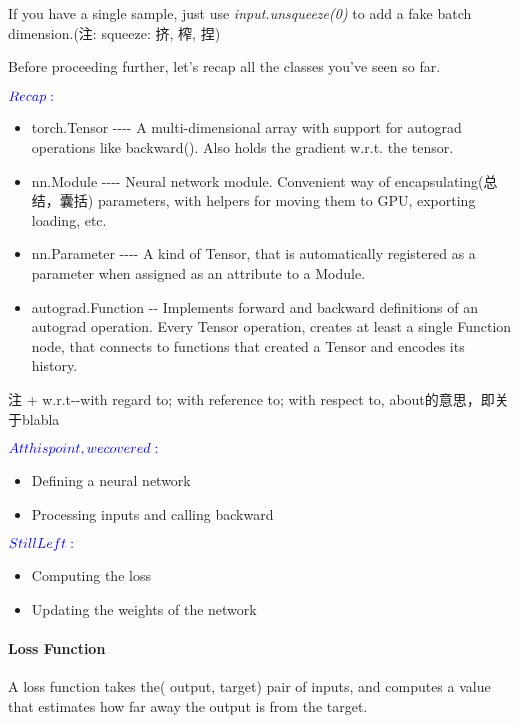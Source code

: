 \documentclass{ctexart}
\providecommand{\tightlist}{%
      \setlength{\itemsep}{0pt}\setlength{\parskip}{0pt}}
\begin{document}
If you have a single sample, just use \emph{input.unsqueeze(0)} to add a
fake batch dimension.(注: squeeze: 挤, 榨, 捏)

Before proceeding further, let's recap all the classes you've seen so
far.

\({\color{blue}{Recap:}}\)

\begin{itemize}
\tightlist
\item
  torch.Tensor -\/-\/-\/- A multi-dimensional array with support for
  autograd operations like backward(). Also holds the gradient w.r.t.
  the tensor.
\item
  nn.Module -\/-\/-\/- Neural network module. Convenient way of
  encapsulating(总结，囊括) parameters, with helpers for moving them to
  GPU, exporting loading, etc.
\item
  nn.Parameter -\/-\/-\/- A kind of Tensor, that is automatically
  registered as a parameter when assigned as an attribute to a Module.
\item
  autograd.Function -\/- Implements forward and backward definitions of
  an autograd operation. Every Tensor operation, creates at least a
  single Function node, that connects to functions that created a Tensor
  and encodes its history.
\end{itemize}

注 + w.r.t-\/-with regard to; with reference to; with respect to,
about的意思，即关于blabla

\({\color{blue}{At this point, we covered:}}\)

\begin{itemize}
\tightlist
\item
  Defining a neural network
\item
  Processing inputs and calling backward
\end{itemize}

\({\color{blue}{Still Left:}}\)

\begin{itemize}
\tightlist
\item
  Computing the loss
\item
  Updating the weights of the network
\end{itemize}

    \paragraph{Loss Function}\label{loss-function}

A loss function takes the( output, target) pair of inputs, and computes
a value that estimates how far away the output is from the target.
\end{document}
